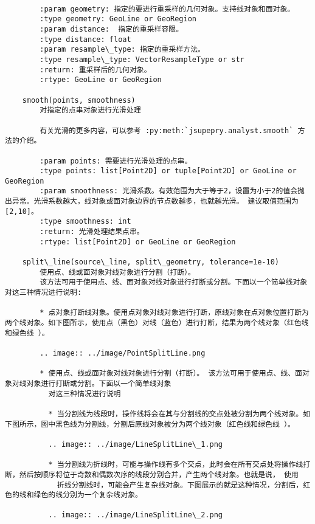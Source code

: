 \documentclass[11pt]{article}
\begin{document}
\begin{Verbatim}[commandchars=\\\{\}]
        
        :param geometry: 指定的要进行重采样的几何对象。支持线对象和面对象。
        :type geometry: GeoLine or GeoRegion
        :param distance:  指定的重采样容限。
        :type distance: float
        :param resample\_type: 指定的重采样方法。
        :type resample\_type: VectorResampleType or str
        :return: 重采样后的几何对象。
        :rtype: GeoLine or GeoRegion
    
    smooth(points, smoothness)
        对指定的点串对象进行光滑处理
        
        有关光滑的更多内容，可以参考 :py:meth:`jsupepry.analyst.smooth` 方法的介绍。
        
        :param points: 需要进行光滑处理的点串。
        :type points: list[Point2D] or tuple[Point2D] or GeoLine or GeoRegion
        :param smoothness: 光滑系数。有效范围为大于等于2，设置为小于2的值会抛出异常。光滑系数越大，线对象或面对象边界的节点数越多，也就越光滑。 建议取值范围为[2,10]。
        :type smoothness: int
        :return: 光滑处理结果点串。
        :rtype: list[Point2D] or GeoLine or GeoRegion
    
    split\_line(source\_line, split\_geometry, tolerance=1e-10)
        使用点、线或面对象对线对象进行分割（打断）。
        该方法可用于使用点、线、面对象对线对象进行打断或分割。下面以一个简单线对象对这三种情况进行说明:
        
        * 点对象打断线对象。使用点对象对线对象进行打断，原线对象在点对象位置打断为两个线对象。如下图所示，使用点（黑色）对线（蓝色）进行打断，结果为两个线对象（红色线和绿色线 ）。
        
        .. image:: ../image/PointSplitLine.png
        
        * 使用点、线或面对象对线对象进行分割（打断）。 该方法可用于使用点、线、面对象对线对象进行打断或分割。下面以一个简单线对象
          对这三种情况进行说明
        
          * 当分割线为线段时，操作线将会在其与分割线的交点处被分割为两个线对象。如下图所示，图中黑色线为分割线，分割后原线对象被分为两个线对象（红色线和绿色线 ）。
        
          .. image:: ../image/LineSplitLine\_1.png
        
          * 当分割线为折线时，可能与操作线有多个交点，此时会在所有交点处将操作线打断，然后按顺序将位于奇数和偶数次序的线段分别合并，产生两个线对象。也就是说， 使用
            折线分割线时，可能会产生复杂线对象。下图展示的就是这种情况，分割后，红色的线和绿色的线分别为一个复杂线对象。
        
          .. image:: ../image/LineSplitLine\_2.png
        

\end{Verbatim}
\end{document}
